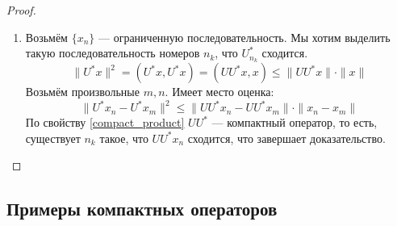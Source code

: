 \documentclass[11pt,openany,a4paper]{scrartcl}
\theoremstyle{plain}
\theoremstyle{definition}
\begin{document}
\begin{proof}
\begin{enumerate}
        \item Возьмём $\{x_n\}$ — ограниченную последовательность. Мы хотим выделить такую
        последовательность номеров $n_k$, что $U_{n_k}^\ast$ сходится.
        $$
        \|U^\ast x\|^2 = (U^\ast x, U^\ast x) =
        (UU^\ast x, x) \leqslant \|UU^\ast x\|\cdot \|x\|        
        $$
        Возьмём произвольные $m, n$. Имеет место оценка:
        $$
        \|U^\ast x_n - U^\ast x_m\|^2 \leqslant
        \|UU^\ast x_n - UU^\ast x_m\| \cdot \|x_n - x_m\|
        $$
        По свойству \ref{compact_product} $UU^\ast$ — компактный оператор, то есть,
        существует $n_k$ такое, что $UU^\ast x_n$ сходится, что завершает доказательство.
    \end{enumerate}
\end{proof}

\subsection{Примеры компактных операторов}
\end{document}
